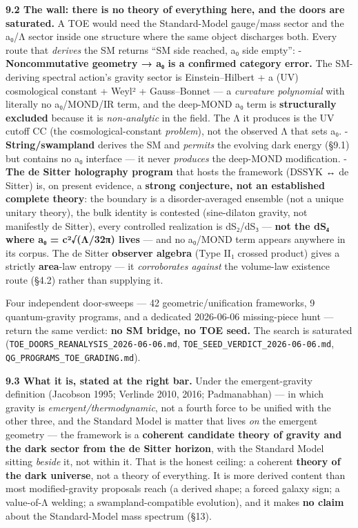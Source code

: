 \documentclass[
]{article}
\begin{document}
\textbf{9.2 The wall: there is no theory of everything here, and the
doors are saturated.} A TOE would need the Standard-Model gauge/mass
sector and the a₀/Λ sector inside one structure where the same object
discharges both. Every route that \emph{derives} the SM returns ``SM
side reached, a₀ side empty'': - \textbf{Noncommutative geometry → a₀ is
a confirmed category error.} The SM-deriving spectral action's gravity
sector is Einstein--Hilbert + a (UV) cosmological constant + Weyl² +
Gauss--Bonnet --- a \emph{curvature polynomial} with literally no
a₀/MOND/IR term, and the deep-MOND a₀ term is \textbf{structurally
excluded} because it is \emph{non-analytic} in the field. The Λ it
produces is the UV cutoff CC (the cosmological-constant \emph{problem}),
not the observed Λ that sets a₀. - \textbf{String/swampland} derives the
SM and \emph{permits} the evolving dark energy (§9.1) but contains no a₀
interface --- it never \emph{produces} the deep-MOND modification. -
\textbf{The de Sitter holography program} that hosts the framework
(DSSYK ↔ de Sitter) is, on present evidence, a \textbf{strong
conjecture, not an established complete theory}: the boundary is a
disorder-averaged ensemble (not a unique unitary theory), the bulk
identity is contested (sine-dilaton gravity, not manifestly de Sitter),
every controlled realization is dS₂/dS₃ --- \textbf{not the dS₄ where a₀
= c²√(Λ/32π) lives} --- and no a₀/MOND term appears anywhere in its
corpus. The de Sitter \textbf{observer algebra} (Type II₁ crossed
product) gives a strictly \textbf{area}-law entropy --- it
\emph{corroborates against} the volume-law existence route (§4.2) rather
than supplying it.

Four independent door-sweeps --- 42 geometric/unification frameworks, 9
quantum-gravity programs, and a dedicated 2026-06-06 missing-piece hunt
--- return the same verdict: \textbf{no SM bridge, no TOE seed.} The
search is saturated (\texttt{TOE\_DOORS\_REANALYSIS\_2026-06-06.md},
\texttt{TOE\_SEED\_VERDICT\_2026-06-06.md},
\texttt{QG\_PROGRAMS\_TOE\_GRADING.md}).

\textbf{9.3 What it is, stated at the right bar.} Under the
emergent-gravity definition (Jacobson 1995; Verlinde 2010, 2016;
Padmanabhan) --- in which gravity is \emph{emergent/thermodynamic}, not
a fourth force to be unified with the other three, and the Standard
Model is matter that lives \emph{on} the emergent geometry --- the
framework is a \textbf{coherent candidate theory of gravity and the dark
sector from the de Sitter horizon}, with the Standard Model sitting
\emph{beside} it, not within it. That is the honest ceiling: a coherent
\textbf{theory of the dark universe}, not a theory of everything. It is
more derived content than most modified-gravity proposals reach (a
derived shape; a forced galaxy sign; a value-of-Λ welding; a
swampland-compatible evolution), and it makes \textbf{no claim} about
the Standard-Model mass spectrum (§13).
\end{document}
